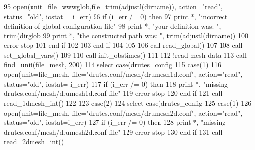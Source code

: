\begin{DoxyCode}
95 \textcolor{comment}{        }\textcolor{keyword}{open}(unit=file_wwwglob,file=trim(adjustl(dirname)), action=\textcolor{stringliteral}{"read"}, status\textcolor{comment}{=}\textcolor{stringliteral}{"old"}\textcolor{comment}{, iostat = i\_err)}
96 \textcolor{comment}{        }\textcolor{keywordflow}{if} (i\_err /= 0) \textcolor{keywordflow}{then}
97           print *, \textcolor{stringliteral}{"incorrect definition of global configuration file"}
98           print *, \textcolor{stringliteral}{"your definition was: "}, trim(dirglob%
99           print *, \textcolor{stringliteral}{"the constructed path was: "}, trim(adjustl(dirname))
100           error stop
101 \textcolor{keywordflow}{        end if}
102 
103 \textcolor{keywordflow}{      end if}
104      
105       
106       \textcolor{keyword}{call }read_global()
107      
108       \textcolor{keyword}{call }set\_global\_vars()
109       
110       \textcolor{keyword}{call }init\_obstimes()
111 
112        \textcolor{comment}{!read mesh data}
113       \textcolor{keyword}{call }find_unit(file_mesh, 200)
114       \textcolor{keywordflow}{select case}(drutes_config%
115         \textcolor{keywordflow}{case}(1)
116           \textcolor{keyword}{open}(unit=file_mesh, file=\textcolor{stringliteral}{"drutes.conf/mesh/drumesh1d.conf"}, action\textcolor{comment}{=}\textcolor{stringliteral}{"read"}\textcolor{comment}{, status=}\textcolor{stringliteral}{"old"}\textcolor{comment}{, iostat=
      i\_err)}
117 \textcolor{comment}{          }\textcolor{keywordflow}{if} (i\_err /= 0) \textcolor{keywordflow}{then}
118             print *, \textcolor{stringliteral}{"missing drutes.conf/mesh/drumesh1d.conf file"}
119             error stop
120 \textcolor{keywordflow}{          end if}
121           \textcolor{keyword}{call }read_1dmesh_int()
122 
123         \textcolor{keywordflow}{case}(2)
124           \textcolor{keywordflow}{select case}(drutes_config%
125             \textcolor{keywordflow}{case}(1)
126               \textcolor{keyword}{open}(unit=file_mesh, file=\textcolor{stringliteral}{"drutes.conf/mesh/drumesh2d.conf"}, action\textcolor{comment}{=}\textcolor{stringliteral}{"read"}\textcolor{comment}{, status=}\textcolor{stringliteral}{"old"}\textcolor{comment}{, 
      iostat=i\_err)}
127 \textcolor{comment}{              }\textcolor{keywordflow}{if} (i\_err /= 0) \textcolor{keywordflow}{then}
128                 print *, \textcolor{stringliteral}{"missing drutes.conf/mesh/drumesh2d.conf file"}
129                 error stop
130 \textcolor{keywordflow}{              end if}
131               \textcolor{keyword}{call }read_2dmesh_int()

\end{DoxyCode}
